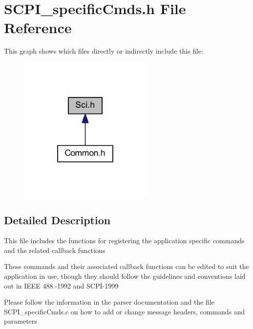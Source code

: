 \hypertarget{a00029}{\section{S\-C\-P\-I\-\_\-specific\-Cmds.\-h File Reference}
\label{a00029}
}
This graph shows which files directly or indirectly include this file\-:
\nopagebreak
\begin{figure}[H]
\begin{center}
\leavevmode
\includegraphics[width=190pt]{a00053}
\end{center}
\end{figure}


\subsection{Detailed Description}
This file includes the functions for registering the application specific commands and the related callback functions

These commands and their associated callback functions can be edited to suit the application in use, though they should follow the guidelines and conventions laid out in I\-E\-E\-E 488.-\/1992 and S\-C\-P\-I-\/1999

Please follow the information in the parser documentation and the file S\-C\-P\-I\-\_\-specific\-Cmds.\-c on how to add or change message headers, commands and parameters

